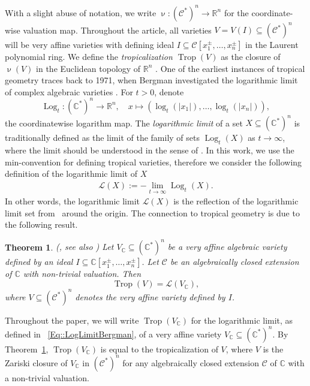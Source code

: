 \documentclass{article}
\newtheorem{theorem}{Theorem}[section]
\theoremstyle{definition}
\DeclareMathOperator{\val}{\nu}
\DeclareMathOperator{\Trop}{Trop}
\DeclareMathOperator{\Log}{Log}
\newcommand{\C}{\mathbb{C}}
\newcommand{\LL}{\mathcal{L}}
\begin{document}
With a slight abuse of notation, we write $\val \colon (\mathcal{C}^{*})^n\to \mathbb{R}^n$ for the coordinate-wise valuation map.
Throughout the article, all varieties $V = V(I) \subseteq (\mathcal{C}^{*})^n$ will be very affine varieties with defining ideal $I \subseteq \mathcal{C}[x_1^\pm, \dots, x_n^\pm]$ in the Laurent polynomial ring.
We define the \emph{tropicalization $\Trop(V)$} as the closure of $\val(V)$ in the Euclidean topology of $\mathbb{R}^n$ \cite[Theorem 3.2.3]{maclagan2015introduction}. One of the earliest instances of tropical geometry traces back to 1971, when Bergman investigated the logarithmic limit of complex algebraic varieties \cite{loglims}. For $t > 0$, denote
 \[\Log _t:\left(\mathbb{C}^*\right)^n \to \mathbb{R}^n, \quad x \mapsto\left(\log _t\left(\left|x_1\right|\right), \ldots, \log _t\left(\left|x_n\right|\right)\right), \]
 the coordinatewise logarithm map. The \emph{logarithmic limit} of a set $X \subseteq (\C^*)^n$ is traditionally  defined as the limit of the family of sets $\Log_t(X)$ as $t \to \infty$, where the limit should be understood in the sense of \cite[Section 2.1]{Alessandrini::LogLimit}.
 In this work, we use the min-convention for defining tropical varieties, therefore we consider the following definition of the logarithmic limit of $X$
 \begin{align}
     \label{Eq::LogLimitBergman}
     \LL(X) := - \lim_{t \to \infty} \Log_t(X).
 \end{align}
In other words, the logarithmic limit $\LL(X)$ is the reflection of the logarithmic limit set from~\cite{loglims} around the origin. The connection to tropical geometry is due to the following result.


\begin{theorem} 
\label{Thm::ComplexLogLimit}
(\cite{Jonsson:Amoeba}, see also \cite[Theorem 1.4.2]{maclagan2015introduction})
     Let $V_\mathbb{C} \subseteq (\mathbb{C}^*)^n$ be a very affine algebraic variety defined by an ideal $I \subseteq \C[x_1^\pm, \dots ,x_n^\pm]$. Let $\mathcal{C}$ be an algebraically closed extension of $\C$ with non-trivial valuation. Then
     \[ \Trop(V) = \LL(V_\C),\]
     where $V \subseteq (\mathcal{C}^*)^n$ denotes the very affine variety defined by $I$. 
\end{theorem}

Throughout the paper, we will write $\Trop(V_{\mathbb{C}})$ for the logarithmic limit, as defined in ~\eqref{Eq::LogLimitBergman}, of a very affine variety $V_\mathbb{C} \subseteq (\mathbb{C}^*)^n$. By Theorem~\ref{Thm::ComplexLogLimit}, $\Trop(V_{\mathbb{C}})$ is equal to the tropicalization of $V$, where $V$ is the Zariski closure of $V_{\mathbb{C}}$ in $(\mathcal{C}^*)^n$ for any algebraically closed extension $\mathcal{C}$ of $\mathbb{C}$ with a non-trivial valuation.  
\end{document}
